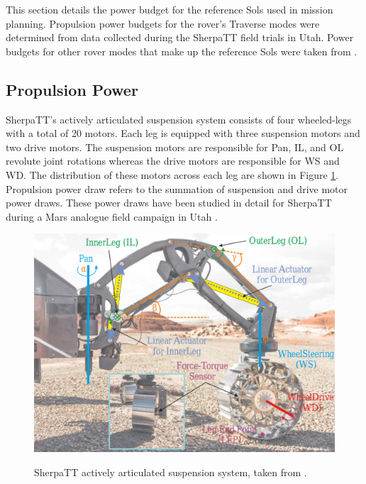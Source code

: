 This section details the power budget for the reference Sols used in mission planning. Propulsion power budgets for the rover's Traverse modes were determined from data collected during the SherpaTT field trials in Utah. Power budgets for other rover modes that make up the reference Sols were taken from .


\subsection{Propulsion Power}
\label{sec:PowerBudget:PropulsionPowerBudget}
SherpaTT's actively articulated suspension system consists of four wheeled-legs with a total of 20 motors. Each leg is equipped with three suspension motors and two drive motors. The suspension motors are responsible for Pan, \ac{IL}, and \ac{OL} revolute joint rotations whereas the drive motors are responsible for \ac{WS} and \ac{WD}. The distribution of these motors across each leg are shown in Figure \ref{fig:sherpatt-actively-articulated-suspension-system}. Propulsion power draw refers to the summation of suspension and drive motor power draws. These power draws have been studied in detail for SherpaTT during a Mars analogue field campaign in Utah .

\begin{figure}[h]
  \centering
  \hypersetup{linkcolor=captionTextColor}
  \includegraphics[width=0.6\linewidth]{sections/design/power-budget/images/sherpatt-actively-articulated-suspension-sytem.png}\\
  \caption[SherpaTT actively articulated suspension system]
          {SherpaTT actively articulated suspension system, taken from .}
  \label{fig:sherpatt-actively-articulated-suspension-system}
\end{figure}

